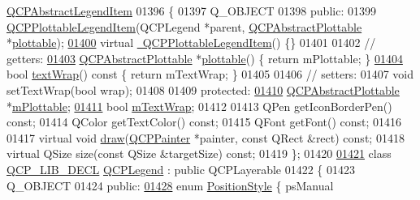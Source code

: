 \begin{DoxyCode}
      \hyperlink{a00023}{QCPAbstractLegendItem}
01396 \{
01397   Q\_OBJECT
01398 \textcolor{keyword}{public}:
01399   \hyperlink{a00048}{QCPPlottableLegendItem}(QCPLegend *parent, 
      \hyperlink{a00024}{QCPAbstractPlottable} *\hyperlink{a00116_a5c198d46ea2a2255a1b73e2c590f0364}{plottable});
\hypertarget{a00116_source_l01400}{}\hyperlink{a00048_aec1295f42ce1f30eea4fc07cef58775e}{01400}   \textcolor{keyword}{virtual} \hyperlink{a00048_aec1295f42ce1f30eea4fc07cef58775e}{~QCPPlottableLegendItem}() \{\}
01401   
01402   \textcolor{comment}{// getters:}
\hypertarget{a00116_source_l01403}{}\hyperlink{a00048_af29e9a2c60b4cba0cac2447b8af7b488}{01403}   \hyperlink{a00024}{QCPAbstractPlottable} *\hyperlink{a00048_af29e9a2c60b4cba0cac2447b8af7b488}{plottable}() \{ \textcolor{keywordflow}{return} mPlottable; \}
\hypertarget{a00116_source_l01404}{}\hyperlink{a00048_a93d3d9ccfa537ff9935eef649ff52ebe}{01404}   \textcolor{keywordtype}{bool} \hyperlink{a00048_a93d3d9ccfa537ff9935eef649ff52ebe}{textWrap}()\textcolor{keyword}{ const }\{ \textcolor{keywordflow}{return} mTextWrap; \}
01405   
01406   \textcolor{comment}{// setters:}
01407   \textcolor{keywordtype}{void} setTextWrap(\textcolor{keywordtype}{bool} wrap);
01408   
01409 \textcolor{keyword}{protected}:
\hypertarget{a00116_source_l01410}{}\hyperlink{a00048_ada647fb4b22971a1a424e15b4f6af0d9}{01410}   \hyperlink{a00024}{QCPAbstractPlottable} *\hyperlink{a00048_ada647fb4b22971a1a424e15b4f6af0d9}{mPlottable};
\hypertarget{a00116_source_l01411}{}\hyperlink{a00048_a074d2372cb8954d30ff8ad533462ce96}{01411}   \textcolor{keywordtype}{bool} \hyperlink{a00048_a074d2372cb8954d30ff8ad533462ce96}{mTextWrap};
01412   
01413   QPen getIconBorderPen() \textcolor{keyword}{const};
01414   QColor getTextColor() \textcolor{keyword}{const};
01415   QFont getFont() \textcolor{keyword}{const};
01416 
01417   \textcolor{keyword}{virtual} \textcolor{keywordtype}{void} \hyperlink{a00116_a2e9b3d14dffa43c79835869d488936c9}{draw}(\hyperlink{a00047}{QCPPainter} *painter, \textcolor{keyword}{const} QRect &rect) \textcolor{keyword}{const};
01418   \textcolor{keyword}{virtual} QSize size(\textcolor{keyword}{const} QSize &targetSize) \textcolor{keyword}{const};
01419 \};
01420 
\hypertarget{a00116_source_l01421}{}\hyperlink{a00045}{01421} \textcolor{keyword}{class }\hyperlink{a00116_a5eaab02224a642ded7fb8951e973a02c}{QCP\_LIB\_DECL} \hyperlink{a00045}{QCPLegend} : \textcolor{keyword}{public} QCPLayerable
01422 \{
01423   Q\_OBJECT
01424 \textcolor{keyword}{public}:
\hypertarget{a00116_source_l01428}{}\hyperlink{a00045_aa61c3d82a6c7942dddefbf1ed1f7049fadfd57c395cae91cd95231c926c0a38ca}{01428}   \textcolor{keyword}{enum} \hyperlink{a00045_aa61c3d82a6c7942dddefbf1ed1f7049f}{PositionStyle} \{ psManual       

\end{DoxyCode}

